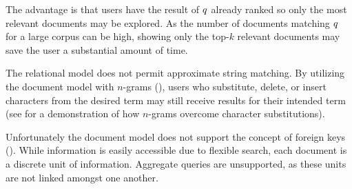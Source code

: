 		The advantage is that users have the result of $q$ already ranked so only the most relevant documents may be explored.  As the number of documents matching $q$ for a large corpus can be high, showing only the top-$k$ relevant documents may save the user a substantial amount of time.
		
		The relational model does not permit approximate string matching.  By utilizing the document model with $n$-grams (), users who substitute, delete, or insert characters from the desired term may still receive results for their intended term (see  for a demonstration of how $n$-grams overcome character substitutions).
		
		Unfortunately the document model does not support the concept of foreign keys ().  While information is easily accessible due to flexible search, each document is a discrete unit of information.  Aggregate queries are unsupported, as these units are not linked amongst one another.